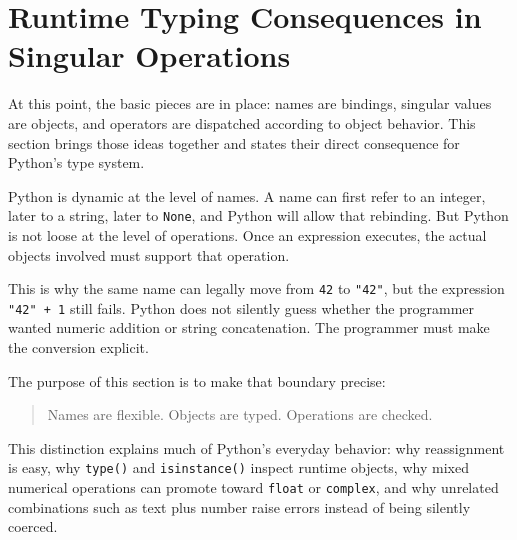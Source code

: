 \section{Runtime Typing Consequences in Singular Operations}

At this point, the basic pieces are in place: names are bindings, singular values are objects, and operators are dispatched according to object behavior. This section brings those ideas together and states their direct consequence for Python's type system.

Python is dynamic at the level of names. A name can first refer to an integer, later to a string, later to \texttt{None}, and Python will allow that rebinding. But Python is not loose at the level of operations. Once an expression executes, the actual objects involved must support that operation.

This is why the same name can legally move from \texttt{42} to \texttt{"42"}, but the expression \texttt{"42" + 1} still fails. Python does not silently guess whether the programmer wanted numeric addition or string concatenation. The programmer must make the conversion explicit.

The purpose of this section is to make that boundary precise:

\begin{quote}
Names are flexible. Objects are typed. Operations are checked.
\end{quote}

This distinction explains much of Python's everyday behavior: why reassignment is easy, why \texttt{type()} and \texttt{isinstance()} inspect runtime objects, why mixed numerical operations can promote toward \texttt{float} or \texttt{complex}, and why unrelated combinations such as text plus number raise errors instead of being silently coerced.